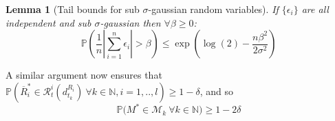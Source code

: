 \documentclass{article}
\newtheorem{lemma}{Lemma}
\newcommand{\Prob}{\mathds{P}}
\newcommand{\Nat}{\mathbb{N}}
\newcommand{\Xc}{\mathcal{X}}
\newcommand{\Rc}{\mathcal{R}}
\newcommand{\Mc}{\mathcal{M}}
\begin{document}
\begin{lemma}[Tail bounds for sub $\sigma$-gaussian random variables]
\label{lem: tail}
\hspace{0.000000001mm} \newline
If $\{ \epsilon_i \}$ are all independent and sub $\sigma$-gaussian then $\forall \beta \ge 0$:
$$\Prob \left( \frac{1}{n} | \sum_{i=1}^n \epsilon_i | > \beta \right) \le \exp\left( \log(2) -\frac{n \beta^2}{2 \sigma^2} \right) $$
\end{lemma}
A similar argument now ensures that
$\Prob \left( \overline{R}^*_i \in \Rc^i_t(d_{t_k}^{R_i}) \ \forall k \in \Nat,i=1,..,l  \right) \ge 1 - \delta $, and so
\begin{equation}
\label{eq: conf}
	\Prob \bigg( M^*\in \Mc_k \ \forall k \in \Nat  \bigg) \ge 1 - 2\delta
\end{equation}

\end{document}
